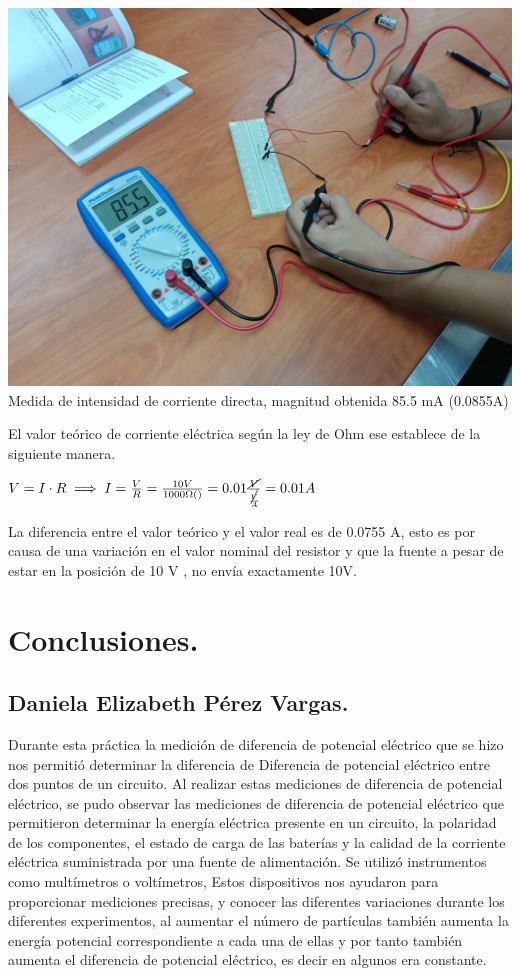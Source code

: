 \documentclass[10pt]{article}
\begin{document}
\begin{multicols}{2}
\begin{center}
	\includegraphics[scale = 0.1]{Imagenes/Fotos/Reina.jpeg}\\
	Medida de intensidad de corriente directa, magnitud obtenida 85.5 mA (0.0855A)
\end{center}
El valor teórico de corriente eléctrica según la ley de Ohm ese establece de la siguiente manera.


	$V = I \cdot R \implies  I = \frac{V}{R} = \frac{10V}{1000\Omega()} = 0.01 \frac{\cancel{V}}{\frac{\cancel{V}}{A}} = 0.01A$ 

La diferencia entre el valor teórico y el valor real es de 0.0755 A, esto es por causa de una variación en el valor nominal del resistor y que la fuente a pesar de estar en la posición de 10 V , no envía exactamente 10V.

\section{Conclusiones.}

\subsection*{Daniela Elizabeth Pérez Vargas.}
Durante esta práctica la medición de diferencia de potencial eléctrico que se hizo nos permitió determinar la diferencia de Diferencia de potencial eléctrico entre dos puntos de un circuito. 
Al realizar estas mediciones de diferencia de potencial eléctrico, se pudo observar las mediciones de diferencia de potencial eléctrico que  permitieron determinar la energía eléctrica presente en un circuito, la polaridad de los componentes, el estado de carga de las baterías y la calidad de la corriente eléctrica suministrada por una fuente de alimentación. Se utilizó  instrumentos como multímetros o voltímetros, Estos dispositivos nos ayudaron para proporcionar mediciones precisas, y conocer las diferentes variaciones durante los diferentes experimentos, al aumentar el número de partículas también aumenta la energía potencial correspondiente a cada una de ellas y por tanto también aumenta el diferencia de potencial eléctrico, es decir en algunos era constante. 

\end{multicols}
\end{document}
